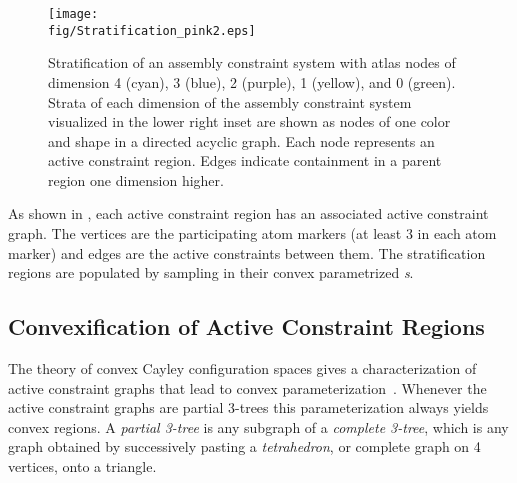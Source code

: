 \begin{figure*}
\begin{center}
\texttt{[image: \\fig/Stratification\_pink2.eps]}
\end{center}
\caption{Stratification of an assembly constraint system with atlas nodes of
    dimension 4 (cyan), 3 (blue), 2 (purple), 1 (yellow), and 0 (green). Strata of
	each dimension of the assembly constraint system visualized in the
	lower right inset are shown as nodes of one color and shape in a
	directed acyclic graph. Each node represents an active constraint
region. Edges indicate containment in a parent region one dimension higher.}
\label{fig:natlas}
\end{figure*}


As shown in , each active constraint region has an
associated active constraint graph. The vertices are the participating
atom markers (at least 3 in each atom marker) and edges are the active
constraints between them. The stratification regions are populated by sampling in
their convex parametrized \textit{\chart s}.


\begin{comment}
\begin{figure*}
\begin{center}
\texttt{[image: \\fig/pctreeFlips.eps]}
\end{center} \caption{Each region of the atlas is identified by a (small)
\textit{active constraint graph}. \troy{this image is difficult to look at,
it's very blurry. I think it's because of shadows. Also, it isn't immediately
clear which is the active constraint graph. Why are the sweep view and some
nodes in here?}}

\label{fig:flips}
\end{figure*}
\end{comment}


\subsection{Convexification of Active Constraint Regions} The theory of convex
Cayley configuration spaces gives a characterization of active constraint graphs
that lead to convex parameterization~\cite{Gao}. Whenever the active constraint
graphs are partial 3-trees this parameterization always yields convex regions.
A \emph{partial 3-tree} is any subgraph of a \emph{complete 3-tree}, which is
any graph obtained by successively pasting a \emph{tetrahedron}, or complete
graph on 4 vertices, onto a triangle.

